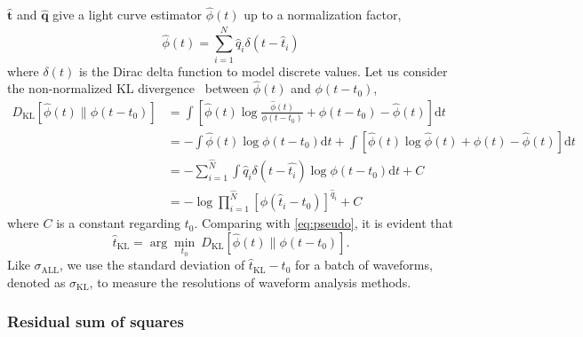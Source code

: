 $\bm{\hat{t}}$ and $\bm{\hat{q}}$ give a light curve estimator $\hat{\phi}(t)$ up to a normalization factor,
\begin{equation}
  \label{eq:lc}
  \hat{\phi}(t) = \sum_{i=1}^{\hat{N}} \hat{q}_i\delta(t-\hat{t}_i)
\end{equation}
where $\delta(t)$ is the Dirac delta function to model discrete values. Let us consider the non-normalized KL divergence~\cite{mihoko_robust_2002} between $\hat{\phi}(t)$ and $\phi(t-t_{0})$,
\begin{equation}
  \begin{aligned}
    D_\mathrm{KL}\left[\hat{\phi}(t) \parallel \phi(t-t_0)\right] & =\int \left[\hat{\phi}(t) \log\frac{\hat{\phi}(t)}{\phi(t-t_0)} + \phi(t-t_0) - \hat{\phi}(t) \right]\mathrm{d}t \\
    & = - \int \hat{\phi}(t) \log\phi(t-t_0)\mathrm{d}t + \int \left[\hat{\phi}(t) \log\hat{\phi}(t) + \phi(t) - \hat{\phi}(t) \right]\mathrm{d}t \\
    & = - \sum_{i=1}^{\hat{N}}\int \hat{q}_i\delta(t-\hat{t_i}) \log\phi(t-t_0)\mathrm{d}t + C \\
    & = -\log \prod_{i=1}^{\hat{N}} \left[\phi(\hat{t}_i-t_0)\right]^{\hat{q}_i} + C
  \label{eq:kl}
  \end{aligned}
\end{equation}
where $C$ is a constant regarding $t_0$. Comparing with \eqref{eq:pseudo}, it is evident that
\begin{equation}
  \label{eq:kl2}
  \hat{t}_\mathrm{KL} = \arg\underset{t_0}{\min}~D_\mathrm{KL}\left[\hat{\phi}(t) \parallel \phi(t-t_0)\right].
\end{equation}
Like $\sigma_\mathrm{ALL}$, we use the standard deviation of $\hat{t}_\mathrm{KL} - t_0$ for a 
batch of waveforms, denoted as $\sigma_\mathrm{KL}$, to measure the resolutions of waveform analysis methods.

\subsubsection{Residual sum of squares}
\label{sec:rss}

